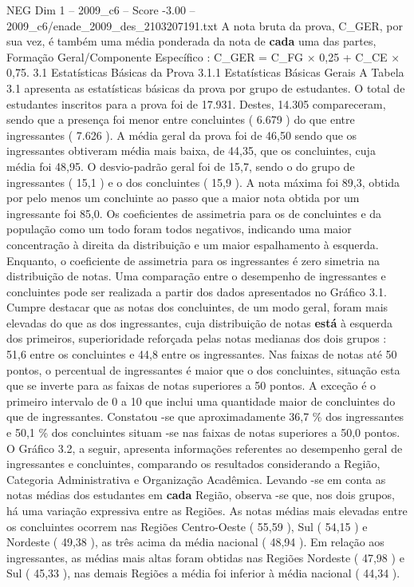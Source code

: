 \begin{textsample}{NEG Dim 1 – 2009\_c6 – Score -3.00 – 2009\_c6/enade\_2009\_des\_2103207191.txt}
A nota bruta da prova, C\_GER, por sua vez, é também uma média ponderada da nota de \textbf{cada} uma das partes, Formação Geral/Componente Específico : C\_GER = C\_FG × 0,25 + C\_CE × 0,75. 3.1 Estatísticas Básicas da Prova 3.1.1 Estatísticas Básicas Gerais A Tabela 3.1 apresenta as estatísticas básicas da prova por grupo de estudantes.
O total de estudantes inscritos para a prova foi de 17.931.
Destes, 14.305 compareceram, sendo que a presença foi menor entre concluintes ( 6.679 ) do que entre ingressantes ( 7.626 ).
A média geral da prova foi de 46,50 sendo que os ingressantes obtiveram média mais baixa, de 44,35, que os concluintes, cuja média foi 48,95.
O desvio-padrão geral foi de 15,7, sendo o do grupo de ingressantes ( 15,1 ) e o dos concluintes ( 15,9 ).
A nota máxima foi 89,3, obtida por pelo menos um concluinte ao passo que a maior nota obtida por um ingressante foi 85,0.
Os coeficientes de assimetria para os de concluintes e da população como um todo foram todos negativos, indicando uma maior concentração à direita da distribuição e um maior espalhamento à esquerda.
Enquanto, o coeficiente de assimetria para os ingressantes é zero simetria na distribuição de notas.
Uma comparação entre o desempenho de ingressantes e concluintes pode ser realizada a partir dos dados apresentados no Gráfico 3.1.
Cumpre destacar que as notas dos concluintes, de um modo geral, foram mais elevadas do que as dos ingressantes, cuja distribuição de notas \textbf{está} à esquerda dos primeiros, superioridade reforçada pelas notas medianas dos dois grupos : 51,6 entre os concluintes e 44,8 entre os ingressantes.
Nas faixas de notas até 50 pontos, o percentual de ingressantes é maior que o dos concluintes, situação esta que se inverte para as faixas de notas superiores a 50 pontos.
A exceção é o primeiro intervalo de 0 a 10 que inclui uma quantidade maior de concluintes do que de ingressantes.
Constatou -se que aproximadamente 36,7 \% dos ingressantes e 50,1 \% dos concluintes situam -se nas faixas de notas superiores a 50,0 pontos.
O Gráfico 3.2, a seguir, apresenta informações referentes ao desempenho geral de ingressantes e concluintes, comparando os resultados considerando a Região, Categoria Administrativa e Organização Acadêmica.
Levando -se em conta as notas médias dos estudantes em \textbf{cada} Região, observa -se que, nos dois grupos, há uma variação expressiva entre as Regiões.
As notas médias mais elevadas entre os concluintes ocorrem nas Regiões Centro-Oeste ( 55,59 ), Sul ( 54,15 ) e Nordeste ( 49,38 ), as três acima da média nacional ( 48,94 ).
Em relação aos ingressantes, as médias mais altas foram obtidas nas Regiões Nordeste ( 47,98 ) e Sul ( 45,33 ), nas demais Regiões a média foi inferior à média nacional ( 44,34 ).

\end{textsample}
